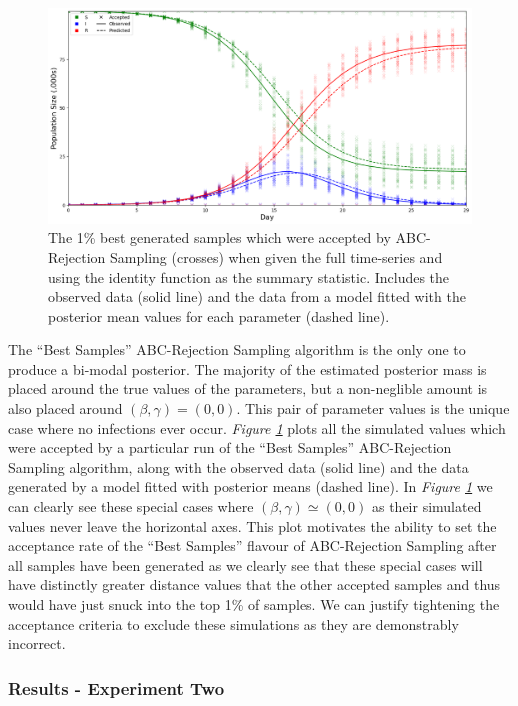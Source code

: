 \documentclass[11pt,a4paper]{article}
\theoremstyle{break}
\begin{document}
  \begin{figure}[H]
    \centering\includegraphics[width=.7\textwidth]{abc_rejection_accepted.png}
    \caption{The 1\% best generated samples which were accepted by ABC-Rejection Sampling (crosses) when given the full time-series and using the identity function as the summary statistic. Includes the observed data (solid line) and the data from a model fitted with the posterior mean values for each parameter (dashed line).}
    \label{fig_abc_rejection_accepted}
  \end{figure}

  \par The ``Best Samples'' ABC-Rejection Sampling algorithm is the only one to produce a bi-modal posterior. The majority of the estimated posterior mass is placed around the true values of the parameters, but a non-neglible amount is also placed around $(\beta,\gamma)=(0,0)$. This pair of parameter values is the unique case where no infections ever occur. \textit{Figure \ref{fig_abc_rejection_accepted}} plots all the simulated values which were accepted by a particular run of the ``Best Samples'' ABC-Rejection Sampling algorithm, along with the observed data (solid line) and the data generated by a model fitted with posterior means (dashed line). In \textit{Figure \ref{fig_abc_rejection_accepted}} we can clearly see these special cases where $(\beta,\gamma)\simeq(0,0)$ as their simulated values never leave the horizontal axes. This plot motivates the ability to set the acceptance rate of the ``Best Samples'' flavour of ABC-Rejection Sampling after all samples have been generated as we clearly see that these special cases will have distinctly greater distance values that the other accepted samples and thus would have just snuck into the top 1\% of samples. We can justify tightening the acceptance criteria to exclude these simulations as they are demonstrably incorrect.

\subsubsection*{Results - Experiment Two}
\end{document}
